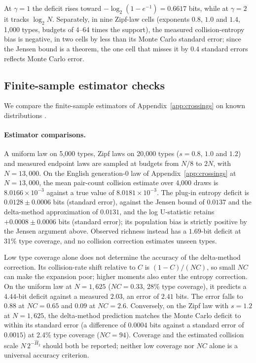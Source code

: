\documentclass[10pt]{article}
\theoremstyle{plain}
\theoremstyle{definition}
\begin{document}
At $\gamma=1$ the deficit rises toward $-\log_2(1-e^{-1})=0.6617$ bits, while at $\gamma=2$ it
tracks $\log_2N$. Separately, in nine Zipf-law cells (exponents $0.8$, $1.0$ and $1.4$, 1,000
types, budgets of 4--64 times the support), the measured collision-entropy bias is negative, in
two cells by less than its Monte Carlo standard error; since the Jensen bound is a theorem, the
one cell that misses it by $0.4$ standard errors reflects Monte Carlo error.

\subsection{Finite-sample estimator checks}
\label{app:rarefy-emp}

We compare the finite-sample estimators of Appendix~\ref{app:crossings} on known distributions
\citep[cf.][]{chao2012coverage,chao2014rarefaction}.

\paragraph{Estimator comparisons.} A uniform law on 5,000 types, Zipf laws on 20,000 types ($s=0.8$, $1.0$ and $1.2$) and measured endpoint laws
are sampled at budgets from $N/8$ to $2N$, with $N=13{,}000$. On the English generation-0 law of
Appendix~\ref{app:crossings} at $N=13{,}000$, the mean pair-count collision estimate over 4,000
draws is $8.0166\times10^{-3}$ against a true value of $8.0181\times10^{-3}$. The plug-in
entropy deficit is $0.0128\pm0.0006$ bits (standard error), against the Jensen bound of $0.0137$ and the
delta-method approximation of $0.0131$, and the log U-statistic retains $+0.0008\pm0.0006$ bits (standard error); its population bias is strictly positive by the Jensen argument above. Observed
richness instead has a $1.69$-bit deficit at 31\% type coverage, and no collision correction
estimates unseen types.

Low type coverage alone does not determine the accuracy of the delta-method correction. Its
collision-rate shift relative to $C$ is $(1-C)/(NC)$, so small $NC$ can make the expansion
poor; higher moments also enter the entropy correction. On the uniform law at $N=1{,}625$
($NC=0.33$, 28\% type coverage), it predicts a $4.44$-bit deficit against a measured $2.03$,
an error of $2.41$ bits. The error falls to $0.88$ at $NC=0.65$ and $0.09$ at $NC=2.6$.
Conversely, on the Zipf law with $s=1.2$ at $N=1{,}625$, the delta-method prediction matches the Monte Carlo
deficit to within its standard error (a difference of $0.0004$ bits against a standard error of $0.0015$) at
2.4\% type coverage ($NC=94$). Coverage and the estimated collision scale $N\,2^{-\widehat H_2}$ should both be
reported; neither low coverage nor $NC$ alone is a universal accuracy criterion.
\end{document}
